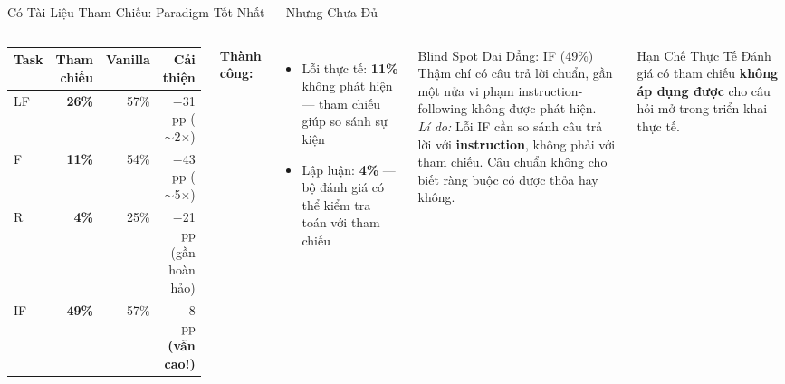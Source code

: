 \documentclass[aspectratio=169,10pt]{beamer}
\newcommand{\good}[1]{\textcolor{green!60!black}{\textbf{#1}}}
\newcommand{\bad}[1]{\textcolor{aclred}{\textbf{#1}}}
\begin{document}
\begin{frame}{Có Tài Liệu Tham Chiếu: Paradigm Tốt Nhất — Nhưng Chưa Đủ}
  \begin{columns}[T]
      \small
      \begin{tabular}{lrrr}
        \toprule
        \textbf{Task} & \textbf{Tham chiếu} & \textbf{Vanilla} & \textbf{Cải thiện} \\
        \midrule
        LF  & \good{26\%} & 57\% & $-$31 pp ($\sim$2$\times$) \\
        F   & \good{11\%} & 54\% & $-$43 pp ($\sim$5$\times$) \\
        R   & \good{4\%}  & 25\% & $-$21 pp (gần hoàn hảo) \\
        IF  & \bad{49\%}  & 57\% & $-$8 pp \textbf{(vẫn cao!)} \\
        \bottomrule
      \end{tabular}

      \vspace{0.5em}
      \textbf{Thành công:}
      \begin{itemize}
        \item Lỗi thực tế: \good{11\%} không phát hiện — tham chiếu giúp so sánh sự kiện
        \item Lập luận: \good{4\%} — bộ đánh giá có thể kiểm tra toán với tham chiếu
      \end{itemize}

      \begin{alertblock}{Blind Spot Dai Dẳng: IF (49\%)}
      \small
        Thậm chí có câu trả lời chuẩn, gần một nửa vi phạm instruction-following không được phát hiện.\\[0.4em]
        \textit{Lí do:} Lỗi IF cần so sánh câu trả lời với \textbf{instruction}, không phải với tham chiếu. Câu chuẩn không cho biết ràng buộc có được thỏa hay không.
      \end{alertblock}

      \vspace{0.3em}
      \begin{block}{Hạn Chế Thực Tế}
      \small
        Đánh giá có tham chiếu \textbf{không áp dụng được} cho câu hỏi mở trong triển khai thực tế.
      \end{block}
  \end{columns}
\end{frame}
\end{document}

